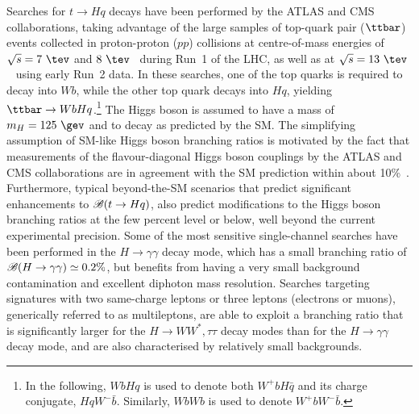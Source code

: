 Searches for $t \to Hq$ decays have been performed by the ATLAS and CMS collaborations, taking advantage of the large samples
of top-quark pair ($\ttbar$) events collected in proton-proton ($pp$) collisions at centre-of-mass energies of $\sqrt{s}=7~\tev$ and $8~\tev$~\cite{Aad:2014dya,Aad:2015pja,Khachatryan:2016atv} during Run~1 of the LHC, as well as at $\sqrt{s}=13~\tev$~\cite{Aaboud:2017mfd,Aaboud:2018pob,Sirunyan:2017uae} using early Run~2 data.
In these searches, one of the top quarks is required to decay into $Wb$, while the other top quark decays into $Hq$, yielding $\ttbar \to WbHq$.\footnote{ 
In the following, $WbHq$ is used to denote both $W^+b H\bar{q}$ and its charge conjugate, $HqW^- \bar{b}$. Similarly, 
$WbWb$ is used to denote $W^+b W^- \bar{b}$.}  The Higgs boson is assumed to have a mass of $m_H=125~\gev$ and to decay as predicted by
the SM. The simplifying assumption of SM-like Higgs boson branching ratios is motivated by the fact that measurements of the flavour-diagonal Higgs boson couplings by the ATLAS and CMS collaborations are in agreement with the SM prediction within about 10\%~\cite{Khachatryan:2016vau,Sirunyan:2018koj}. 
Furthermore, typical beyond-the-SM scenarios that predict significant enhancements to $\mathscr{B}(t\to Hq)$, also predict modifications to the Higgs boson branching ratios at the few percent level or below, well beyond the current experimental precision.
Some of the most sensitive single-channel searches have been performed in the $H\to\gamma\gamma$ decay mode, which
has a small branching ratio of $\mathscr{B}(H\to \gamma\gamma)\simeq 0.2\%$, but benefits from having a very small background contamination 
and excellent diphoton mass re\-so\-lu\-tion. 
Searches targeting signatures with two same-charge leptons or three leptons (electrons or muons), generically referred to as multileptons,
are able to exploit a branching ratio that is significantly larger for the $H \rightarrow WW^*, \tau\tau$ decay modes than for the $H \rightarrow \gamma\gamma$ decay mode,
and are also characterised by relatively small backgrounds.
